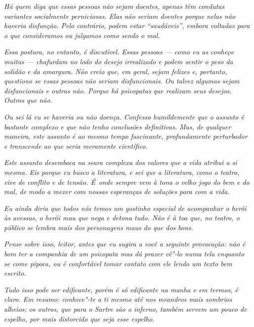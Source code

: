 \emph{Há quem diga que essas pessoas não sejam doentes, apenas têm
condutas variantes socialmente perniciosas. Elas não seriam doentes
porque nelas não haveria disfunção. Pelo contrário, podem estar
``saudáveis'', embora voltadas para o que consideramos ou julgamos como
sendo o mal.}~

\emph{Essa postura, no entanto, é discutível. Essas pessoas --- como eu
as conheço muitas --- chafurdam no lodo do desejo irrealizado e podem
sentir o peso da solidão e da amargura. Não creio que, em geral, sejam
felizes e, portanto, questiono se essas pessoas não seriam
disfuncionais. Ou talvez algumas sejam disfuncionais e outras não.
Porque há psicopatas que realizam seus desejos. Outros que não.}~

\emph{Ou sei lá eu se haveria ou não doença. Confesso humildemente que o
assunto é bastante complexo e que não tenho conclusões definitivas. Mas,
de qualquer maneira, este assunto é ao mesmo tempo fascinante,
profundamente perturbador e transcende ao que seria meramente
científico.}~

\emph{Este assunto desemboca na seara complexa dos valores que a vida
atribui a si mesma. Eis porque eu busco a literatura, e sei que a
literatura, como o teatro, vive de conflito e de tensão. É~onde sempre
vem à tona o velho jogo do bem e do mal, de modo a mexer com nossas
esperanças de soluções para com a vida.}~

\emph{Eu ainda diria que todos nós temos um gostinho especial de
acompanhar o herói às avessas, o herói mau que nega e detona tudo. Não é
à toa que, no teatro, o público se lembra mais dos personagens maus do
que dos bons.}~

\emph{Pense sobre isso, leitor, antes que eu sugira a você a seguinte
provocação: não é bom ter a companhia de um psicopata mas dá prazer
vê"-lo numa tela enquanto se come pipoca, ou é confortável tomar contato
com ele lendo um texto bem escrito.}~

\emph{Tudo isso pode ser edificante, porém é só edificante na manha e em
termos, é claro. Em resumo: conhece"-te a ti mesmo até nos meandros mais
sombrios alheios; os outros, que para o Sartre são o inferno, também
servem um pouco de espelho, por mais distorcido que seja esse espelho.~}
